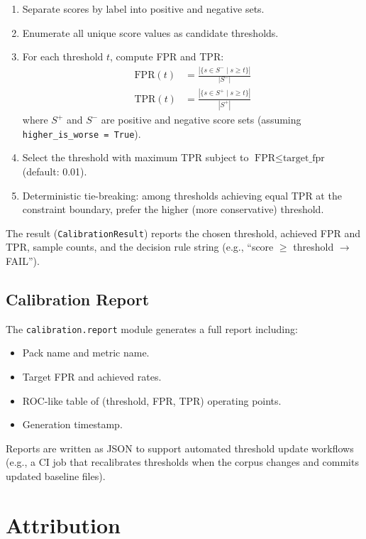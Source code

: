 \documentclass[11pt,a4paper]{article}
\begin{document}
\begin{enumerate}[nosep]
  \item Separate scores by label into positive and negative sets.
  \item Enumerate all unique score values as candidate thresholds.
  \item For each threshold $t$, compute FPR and TPR:
    \begin{align}
    \text{FPR}(t) &= \frac{|\{s \in S^{-} \mid s \geq t\}|}{|S^{-}|} \\
    \text{TPR}(t) &= \frac{|\{s \in S^{+} \mid s \geq t\}|}{|S^{+}|}
    \end{align}
    where $S^{+}$ and $S^{-}$ are positive and negative score sets
    (assuming \texttt{higher\_is\_worse = True}).
  \item Select the threshold with maximum TPR subject to
    $\text{FPR} \leq \text{target\_fpr}$ (default: 0.01).
  \item Deterministic tie-breaking: among thresholds achieving equal
    TPR at the constraint boundary, prefer the higher (more conservative)
    threshold.
\end{enumerate}

The result (\texttt{CalibrationResult}) reports the chosen threshold,
achieved FPR and TPR, sample counts, and the decision rule string
(e.g., ``score $\geq$ threshold $\to$ FAIL'').

\subsection{Calibration Report}

The \texttt{calibration.report} module generates a full report including:
\begin{itemize}[nosep]
  \item Pack name and metric name.
  \item Target FPR and achieved rates.
  \item ROC-like table of (threshold, FPR, TPR) operating points.
  \item Generation timestamp.
\end{itemize}

Reports are written as JSON to support automated threshold update
workflows (e.g., a CI job that recalibrates thresholds when the corpus
changes and commits updated baseline files).

\section{Attribution}\label{sec:attribution}
\end{document}
